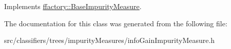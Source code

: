 Implements \hyperlink{classffactory_1_1_base_impurity_measure_ad0e0127a42c1ece9658ebf07e2b26efe}{ffactory\-::\-Base\-Impurity\-Measure}.



The documentation for this class was generated from the following file\-:\begin{DoxyCompactItemize}
\item 
src/classifiers/trees/impurity\-Measures/info\-Gain\-Impurity\-Measure.\-h\end{DoxyCompactItemize}

